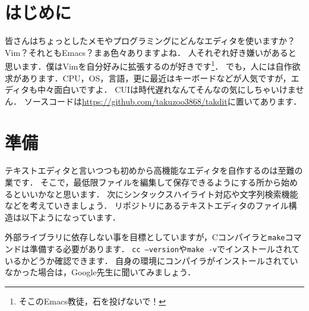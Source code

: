 \section{はじめに}
皆さんはちょっとしたメモやプログラミングにどんなエディタを使いますか？Vim？それともEmacs？まぁ色々ありますよね．
人それぞれ好き嫌いがあると思います．僕はVimを自分好みに拡張するのが好きです\footnote{そこのEmacs教徒，石を投げないで！}．
でも，人には自作欲求があります．CPU，OS，言語，更に最近はキーボードなどが人気ですが，エディタも中々面白いですよ．
CUIは時代遅れなんてそんなの気にしちゃいけません．
ソースコードは\url{https://github.com/takuzoo3868/takdit}に置いてあります．

\section{準備}
テキストエディタと言いつつも初めから高機能なエディタを自作するのは至難の業です．
そこで，最低限ファイルを編集して保存できるようにする所から始めるといいかなと思います．
次にシンタックスハイライト対応や文字列検索機能などを考えていきましょう．
リポジトリにあるテキストエディタのファイル構造は以下ようになっています．

\begin{figure}[H]
\end{figure}
外部ライブラリに依存しない事を目標としていますが，Cコンパイラと\texttt{make}コマンドは準備する必要があります．
\texttt{cc --version}や\texttt{make -v}でインストールされているかどうか確認できます．
自身の環境にコンパイラがインストールされていなかった場合は，Google先生に聞いてみましょう．

